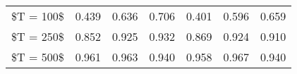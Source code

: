 % 
\begin{tabular}{ccccccc}
  \hline
  \hline
\$T = 100\$ & 0.439 & 0.636 & 0.706 & 0.401 & 0.596 & 0.659 \\ 
  \$T = 250\$ & 0.852 & 0.925 & 0.932 & 0.869 & 0.924 & 0.910 \\ 
  \$T = 500\$ & 0.961 & 0.963 & 0.940 & 0.958 & 0.967 & 0.940 \\ 
   \hline
\end{tabular}
